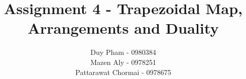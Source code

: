 \documentclass{article}
\begin{document}
\title{Assignment 4 - Trapezoidal Map, Arrangements and Duality }
\author{
	Duy Pham - 0980384 \\
	Mazen Aly - 0978251 \\
	Pattarawat Chormai - 0978675 \\
}
\maketitle



\end{document}
